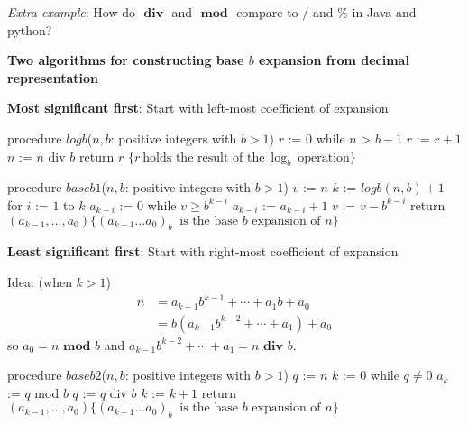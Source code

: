 \documentclass[12pt, oneside]{article}
\begin{document}
\textit{Extra example}: How do $\textbf{ div }$ and $\textbf{ mod }$ compare to $/$ and $\%$ in Java and python?

\vfill
 

{\bf Two algorithms for constructing base $b$ expansion from decimal representation}

{\bf Most significant first}: Start with left-most coefficient of expansion
\begin{multicols}{2}
\begin{algorithm}[caption={Calculating integer part of $\log_b$}]
procedure $\textit{logb}$($n, b$: positive integers with $b > 1$)
$r$ := $0$
while $n$ > $b-1$
  $r$ := $r + 1$
  $n$ := $n$ div $b$
return $r$ $\{ r~\textrm{holds the result of the}~\log_b~\textrm{operation}\}$
\end{algorithm}
\columnbreak
\begin{algorithm}[caption={Calculating base $b$ expansion, from left}]
procedure $\textit{baseb1}$($n, b$: positive integers with $b > 1$)
$v$ := $n$
$k$ := $logb(n,b) + 1$
for $i$ := $1$ to $k$
  $a_{k-i}$ := $0$
  while $v \geq b^{k-i}$
    $a_{k-i}$ := $a_{k-i} + 1$
    $v$ := $v -  b^{k-i}$
return $(a_{k-1}, \ldots, a_0) \{(a_{k-1} \ldots a_0)_b~\textrm{ is the base } b \textrm{ expansion of } n \}$
\end{algorithm}
\end{multicols}

\vfill
\vfill

{\bf Least significant first}: Start with right-most coefficient of expansion

\begin{multicols}{2}
  \begin{minipage}{3.2in}
    Idea: {\tiny(when $k > 1$)} 
    \begin{align*}
      n &= a_{k-1} b^{k-1} + \cdots + a_1 b + a_0 \\
        &= b ( a_{k-1} b^{k-2} + \cdots + a_1) + a_0\end{align*}
    so $a_0 = n \textbf{ mod } b$ and $a_{k-1} b^{k-2} + \cdots + a_1 = n \textbf{ div } b$.

\end{minipage}
\columnbreak
\begin{algorithm}[caption={Calculating base $b$ expansion, from right}]
procedure $\textit{baseb2}$($n, b$: positive integers with $b > 1$)
$q$ := $n$
$k$ := $0$
while $q  \neq 0$
  $a_{k}$ := $q$ mod $b$
  $q$ := $q$ div $b$
  $k$ := $k+1$
return $(a_{k-1}, \ldots, a_0) \{(a_{k-1} \ldots a_0)_b~\textrm{ is the base } b \textrm{ expansion of } n \}$
\end{algorithm}
\end{multicols}
\end{document}
